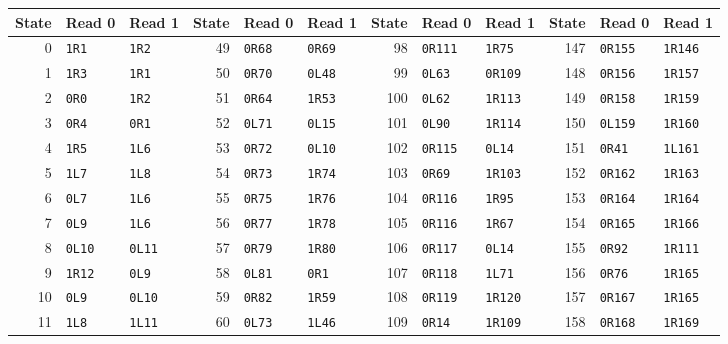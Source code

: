 \begingroup\footnotesize\setlength{\tabcolsep}{4pt}
\begin{center}
\begin{tabular}{@{}rll@{\quad}rll@{\quad}rll@{\quad}rll@{}}
\toprule
State & Read 0 & Read 1 & State & Read 0 & Read 1 & State & Read 0 & Read 1 & State & Read 0 & Read 1\\\midrule
0 & \texttt{1R1} & \texttt{1R2} & 49 & \texttt{0R68} & \texttt{0R69} & 98 & \texttt{0R111} & \texttt{1R75} & 147 & \texttt{0R155} & \texttt{1R146}\\
1 & \texttt{1R3} & \texttt{1R1} & 50 & \texttt{0R70} & \texttt{0L48} & 99 & \texttt{0L63} & \texttt{0R109} & 148 & \texttt{0R156} & \texttt{1R157}\\
2 & \texttt{0R0} & \texttt{1R2} & 51 & \texttt{0R64} & \texttt{1R53} & 100 & \texttt{0L62} & \texttt{1R113} & 149 & \texttt{0R158} & \texttt{1R159}\\
3 & \texttt{0R4} & \texttt{0R1} & 52 & \texttt{0L71} & \texttt{0L15} & 101 & \texttt{0L90} & \texttt{1R114} & 150 & \texttt{0L159} & \texttt{1R160}\\
4 & \texttt{1R5} & \texttt{1L6} & 53 & \texttt{0R72} & \texttt{0L10} & 102 & \texttt{0R115} & \texttt{0L14} & 151 & \texttt{0R41} & \texttt{1L161}\\
5 & \texttt{1L7} & \texttt{1L8} & 54 & \texttt{0R73} & \texttt{1R74} & 103 & \texttt{0R69} & \texttt{1R103} & 152 & \texttt{0R162} & \texttt{1R163}\\
6 & \texttt{0L7} & \texttt{1L6} & 55 & \texttt{0R75} & \texttt{1R76} & 104 & \texttt{0R116} & \texttt{1R95} & 153 & \texttt{0R164} & \texttt{1R164}\\
7 & \texttt{0L9} & \texttt{1L6} & 56 & \texttt{0R77} & \texttt{1R78} & 105 & \texttt{0R116} & \texttt{1R67} & 154 & \texttt{0R165} & \texttt{1R166}\\
8 & \texttt{0L10} & \texttt{0L11} & 57 & \texttt{0R79} & \texttt{1R80} & 106 & \texttt{0R117} & \texttt{0L14} & 155 & \texttt{0R92} & \texttt{1R111}\\
9 & \texttt{1R12} & \texttt{0L9} & 58 & \texttt{0L81} & \texttt{0R1} & 107 & \texttt{0R118} & \texttt{1L71} & 156 & \texttt{0R76} & \texttt{1R165}\\
10 & \texttt{0L9} & \texttt{0L10} & 59 & \texttt{0R82} & \texttt{1R59} & 108 & \texttt{0R119} & \texttt{1R120} & 157 & \texttt{0R167} & \texttt{1R165}\\
11 & \texttt{1L8} & \texttt{1L11} & 60 & \texttt{0L73} & \texttt{1L46} & 109 & \texttt{0R14} & \texttt{1R109} & 158 & \texttt{0R168} & \texttt{1R169}\\

\end{tabular}
\end{center}
